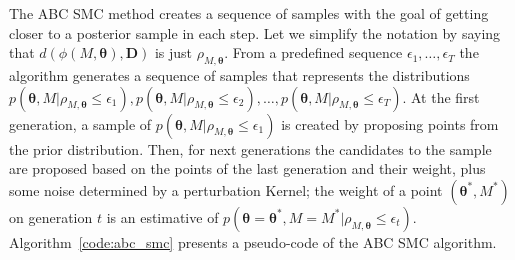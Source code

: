 The ABC SMC method creates a sequence of samples with the goal of 
getting closer to a posterior sample in each step. Let we simplify the
notation by saying that $d(\phi (M, {\bm \theta}), {\bm D})$ is just 
$\rho_{M, {\bm \theta}}$. From a predefined sequence $\epsilon_1,
\ldots, \epsilon_T$ the algorithm generates a sequence of samples that 
represents the distributions $p ({\bm \theta}, M| \rho_{M, {\bm \theta}}
\leq \epsilon_1), p ({\bm \theta}, M| \rho_{M, {\bm \theta}} \leq
\epsilon_2), \ldots, p ({\bm \theta}, M| \rho_{M, {\bm \theta}} \leq
\epsilon_T)$. At the first generation, a sample of $p ({\bm \theta}, M|
\rho_{M, {\bm \theta}} \leq \epsilon_1)$ is created by proposing points
from the prior distribution. Then, for next generations the candidates
to the sample are proposed based on the points of the last generation
and their weight, plus some noise determined by a perturbation Kernel;
the weight of a point $({\bm \theta}^*, M^*)$ on generation $t$ is an
estimative of  $p ({\bm \theta} = {\bm \theta}^*, M = M^* | \rho_{M,
{\bm \theta}} \leq \epsilon_t)$. Algorithm~\ref{code:abc_smc}
presents a pseudo-code of the ABC SMC algorithm.

